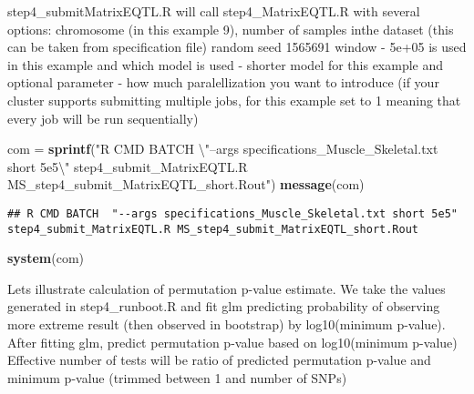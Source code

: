 \documentclass[]{article}
\newenvironment{Shaded}{\begin{snugshade}}{\end{snugshade}}
\newcommand{\KeywordTok}[1]{\textcolor[rgb]{0.13,0.29,0.53}{\textbf{#1}}}
\newcommand{\CharTok}[1]{\textcolor[rgb]{0.31,0.60,0.02}{#1}}
\newcommand{\StringTok}[1]{\textcolor[rgb]{0.31,0.60,0.02}{#1}}
\newcommand{\NormalTok}[1]{#1}
\begin{document}
step4\_submitMatrixEQTL.R will call step4\_MatrixEQTL.R with several
options: chromosome (in this example 9), number of samples inthe dataset
(this can be taken from specification file) random seed 1565691 window -
5e+05 is used in this example and which model is used - shorter model
for this example and optional parameter - how much paralellization you
want to introduce (if your cluster supports submitting multiple jobs,
for this example set to 1 meaning that every job will be run
sequentially)

\begin{Shaded}
\begin{Highlighting}[]
\NormalTok{com =}\StringTok{ }\KeywordTok{sprintf}\NormalTok{(}\StringTok{"R CMD BATCH  }\CharTok{\textbackslash{}"}\StringTok{--args specifications_Muscle_Skeletal.txt short 5e5}\CharTok{\textbackslash{}"}\StringTok{ step4_submit_MatrixEQTL.R MS_step4_submit_MatrixEQTL_short.Rout"}\NormalTok{)}
\KeywordTok{message}\NormalTok{(com)}
\end{Highlighting}
\end{Shaded}

\begin{verbatim}
## R CMD BATCH  "--args specifications_Muscle_Skeletal.txt short 5e5" step4_submit_MatrixEQTL.R MS_step4_submit_MatrixEQTL_short.Rout
\end{verbatim}

\begin{Shaded}
\begin{Highlighting}[]
\KeywordTok{system}\NormalTok{(com)}
\end{Highlighting}
\end{Shaded}

Lets illustrate calculation of permutation p-value estimate. We take the
values generated in step4\_runboot.R and fit glm predicting probability
of observing more extreme result (then observed in bootstrap) by
log10(minimum p-value). After fitting glm, predict permutation p-value
based on log10(minimum p-value) Effective number of tests will be ratio
of predicted permutation p-value and minimum p-value (trimmed between 1
and number of SNPs)
\end{document}
